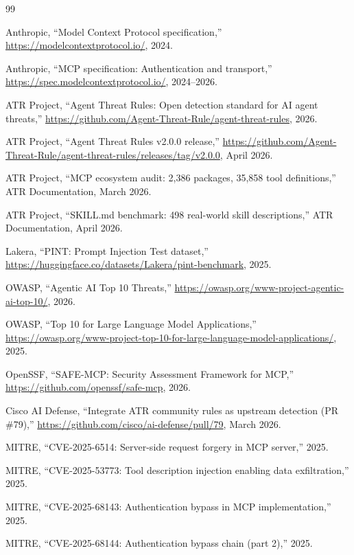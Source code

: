 \documentclass[letterpaper,twocolumn,10pt]{article}
\begin{document}
\begin{thebibliography}{99}

Anthropic,
``Model Context Protocol specification,''
\url{https://modelcontextprotocol.io/}, 2024.

Anthropic,
``MCP specification: Authentication and transport,''
\url{https://spec.modelcontextprotocol.io/}, 2024--2026.

ATR Project,
``Agent Threat Rules: Open detection standard for AI agent threats,''
\url{https://github.com/Agent-Threat-Rule/agent-threat-rules}, 2026.

ATR Project,
``Agent Threat Rules v2.0.0 release,''
\url{https://github.com/Agent-Threat-Rule/agent-threat-rules/releases/tag/v2.0.0}, April 2026.

ATR Project,
``MCP ecosystem audit: 2,386 packages, 35,858 tool definitions,''
ATR Documentation, March 2026.

ATR Project,
``SKILL.md benchmark: 498 real-world skill descriptions,''
ATR Documentation, April 2026.

Lakera,
``PINT: Prompt Injection Test dataset,''
\url{https://huggingface.co/datasets/Lakera/pint-benchmark}, 2025.

OWASP,
``Agentic AI Top 10 Threats,''
\url{https://owasp.org/www-project-agentic-ai-top-10/}, 2026.

OWASP,
``Top 10 for Large Language Model Applications,''
\url{https://owasp.org/www-project-top-10-for-large-language-model-applications/}, 2025.

OpenSSF,
``SAFE-MCP: Security Assessment Framework for MCP,''
\url{https://github.com/openssf/safe-mcp}, 2026.

Cisco AI Defense,
``Integrate ATR community rules as upstream detection (PR \#79),''
\url{https://github.com/cisco/ai-defense/pull/79}, March 2026.

MITRE,
``CVE-2025-6514: Server-side request forgery in MCP server,'' 2025.

MITRE,
``CVE-2025-53773: Tool description injection enabling data exfiltration,'' 2025.

MITRE,
``CVE-2025-68143: Authentication bypass in MCP implementation,'' 2025.

MITRE,
``CVE-2025-68144: Authentication bypass chain (part 2),'' 2025.


\end{thebibliography}
\end{document}
